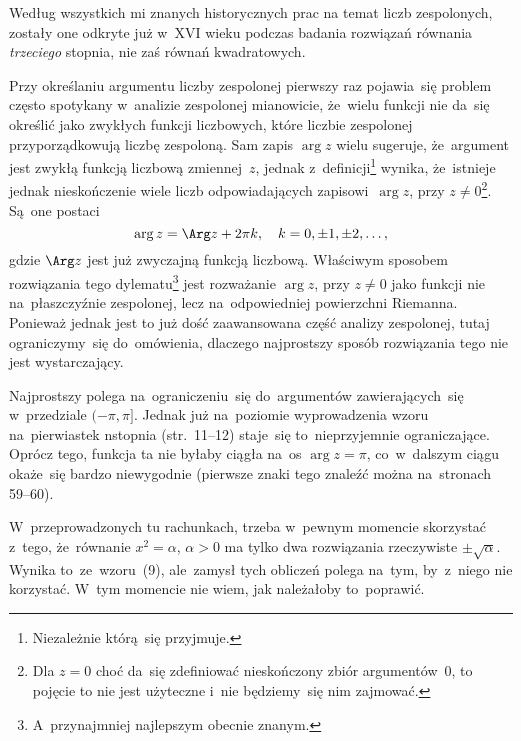 \documentclass[a4paper,11pt]{article}
\begin{document}
\vspace{\spaceFour}


\start {} Według wszystkich mi znanych historycznych prac na
temat liczb zespolonych, zostały one odkryte już w~XVI wieku podczas
badania rozwiązań równania \emph{trzeciego} stopnia, nie zaś równań
kwadratowych. 

\vspace{\spaceFour}


\start {} Przy określaniu argumentu liczby zespolonej pierwszy
raz pojawia~się problem często spotykany w~analizie zespolonej
mianowicie, że~wielu funkcji nie da~się określić jako zwykłych funkcji
liczbowych, które liczbie zespolonej przyporządkowują liczbę
zespoloną. Sam zapis $\arg z$ wielu sugeruje, że~argument jest zwykłą
funkcją liczbową zmiennej~$z$, jednak z~definicji\footnote{Niezależnie
  którą~się przyjmuje.} wynika, że~istnieje jednak nieskończenie wiele
liczb odpowiadających zapisowi~$\arg z$, przy $z \neq 0$\footnote{Dla
  $z = 0$ choć da~się zdefiniować nieskończony zbiór argumentów~0, to
  pojęcie to nie jest użyteczne i~nie będziemy~się nim zajmować.}.
Są~one postaci
\begin{equation}
  \label{eq:Leja-??}
  \arg z = \Arg z + 2\pi k, \quad k = 0, \pm 1, \pm 2,\ld,
\end{equation}
gdzie $\Arg z$ jest już zwyczajną funkcją liczbową. Właściwym sposobem
rozwiązania tego dylematu\footnote{A~przynajmniej najlepszym obecnie
  znanym.} jest rozważanie $\arg z$, przy $z \neq 0$ jako funkcji nie
na~płaszczyźnie zespolonej, lecz na~odpowiedniej powierzchni Riemanna.
Ponieważ jednak jest to już dość zaawansowana część analizy
zespolonej, tutaj ograniczymy~się do~omówienia, dlaczego najprostszy
sposób rozwiązania tego nie jest wystarczający.

Najprostszy polega na~ograniczeniu~się do~argumentów zawierających~się
w~przedziale $( -\pi, \pi ]$. Jednak już na~poziomie wyprowadzenia
wzoru na~pierwiastek n\dywiz stopnia (str.~11--12) staje~się
to~nieprzyjemnie ograniczające. Oprócz tego, funkcja ta nie byłaby
ciągła na~os $\arg z = \pi$, co~w~dalszym ciągu okaże~się bardzo
niewygodnie (pierwsze znaki tego znaleźć można na~stronach 59--60).

\vspace{\spaceFour}


\start {} W~przeprowadzonych tu rachunkach, trzeba w~pewnym
momencie skorzystać z~tego, że~równanie $x^{ 2 } = \alpha$,
$\alpha > 0$ ma tylko dwa rozwiązania rzeczywiste
$\pm \sqrt{ \alpha }$. Wynika to~ze~wzoru~(9), ale~zamysł tych
obliczeń polega na~tym, by~z~niego nie korzystać. W~tym momencie nie
wiem, jak należałoby to~poprawić.
\end{document}
